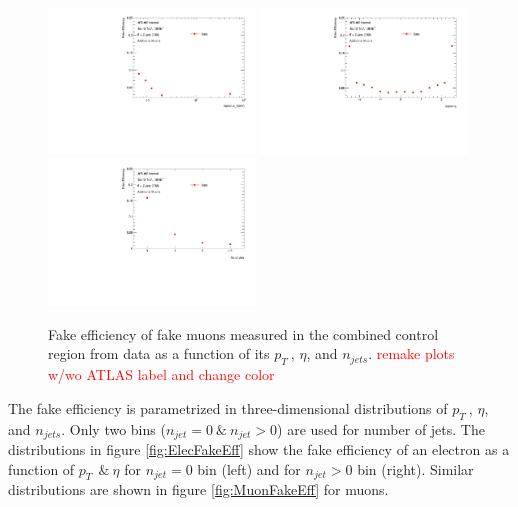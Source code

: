 \begin{figure}[htb]
		\begin{center}
		\includegraphics[width = 0.49\textwidth]{figures/Analysis/Background/Fake_Eff_Muon_pt_1D.pdf}
		\includegraphics[width = 0.49\textwidth]{figures/Analysis/Background/Fake_Eff_Muon_eta_1D.pdf} \\
		\includegraphics[width = 0.49\textwidth]{figures/Analysis/Background/Fake_Eff_Muon_jet_n_1D.pdf} 
		\end{center}
	\caption{Fake efficiency of fake muons measured in the combined control region from data as a function of its $p_{T}~$, $\eta$, and $n_{jets}$. \textcolor{red}{remake plots w/wo ATLAS label and change color} \label{fig:FakeEff_1D_Muon}}
\end{figure}

The fake efficiency is parametrized in three-dimensional distributions of $p_{T}~$, $\eta$, and $n_{jets}$. Only two bins ($n_{jet}=0 ~\& ~ n_{jet} > 0$) are used for number of jets. The distributions in figure \ref{fig:ElecFakeEff} show the fake efficiency of an electron as a function of $p_{T}~ ~\&~ \eta$ for $n_{jet}=0 $ bin (left) and for $n_{jet}>0 $ bin (right). Similar distributions are shown in figure \ref{fig:MuonFakeEff} for muons.  

